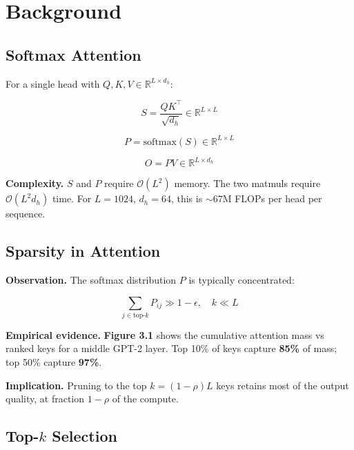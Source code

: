 
\section{Background}

\subsection{Softmax Attention}

For a single head with $Q, K, V \in \mathbb{R}^{L \times d_h}$:

\begin{equation}
S = \frac{Q K^\top}{\sqrt{d_h}} \in \mathbb{R}^{L \times L}
\end{equation}

\begin{equation}
P = \text{softmax}(S) \in \mathbb{R}^{L \times L}
\end{equation}

\begin{equation}
O = P V \in \mathbb{R}^{L \times d_h}
\end{equation}

\textbf{Complexity.} $S$ and $P$ require $\mathcal{O}(L^2)$ memory. The two 
matmuls require $\mathcal{O}(L^2 d_h)$ time. For $L = 1024$, $d_h = 64$, 
this is $\sim 67$M FLOPs per head per sequence.

\subsection{Sparsity in Attention}

\textbf{Observation.} The softmax distribution $P$ is typically concentrated:

\begin{equation}
\sum_{j \in \text{top-}k} P_{ij} \gg 1 - \epsilon, \quad k \ll L
\end{equation}

\textbf{Empirical evidence.} \textbf{Figure 3.1} shows the cumulative attention mass 
vs ranked keys for a middle GPT-2 layer. Top 10\% of keys capture 
\textbf{85\%} of mass; top 50\% capture \textbf{97\%}.

\textbf{Implication.} Pruning to the top $k = (1 - \rho) L$ keys retains most 
of the output quality, at fraction $1 - \rho$ of the compute.

\subsection{Top-$k$ Selection}

